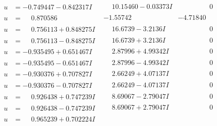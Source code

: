 \documentclass[1p]{elsarticle_modified}
\theoremstyle{definition}
\begin{document}
$$\begin{array}{c|c|c}
 \hline 
\begin{aligned}
u &= -0.749447 - 0.842317 I\end{aligned}
 & \phantom{-}10.15460 - 0.03373 I & \phantom{-0.000000 } 0 \\ \hline\begin{aligned}
u &= \phantom{-}0.870586\phantom{ +0.000000I}\end{aligned}
 & -1.55742\phantom{ +0.000000I} & -4.71840\phantom{ +0.000000I} \\ \hline\begin{aligned}
u &= \phantom{-}0.756113 + 0.848275 I\end{aligned}
 & \phantom{-}16.6739 - 3.2136 I & \phantom{-0.000000 } 0 \\ \hline\begin{aligned}
u &= \phantom{-}0.756113 - 0.848275 I\end{aligned}
 & \phantom{-}16.6739 + 3.2136 I & \phantom{-0.000000 } 0 \\ \hline\begin{aligned}
u &= -0.935495 + 0.651467 I\end{aligned}
 & \phantom{-}2.87996 + 4.99342 I & \phantom{-0.000000 } 0 \\ \hline\begin{aligned}
u &= -0.935495 - 0.651467 I\end{aligned}
 & \phantom{-}2.87996 - 4.99342 I & \phantom{-0.000000 } 0 \\ \hline\begin{aligned}
u &= -0.930376 + 0.707827 I\end{aligned}
 & \phantom{-}2.66249 + 4.07137 I & \phantom{-0.000000 } 0 \\ \hline\begin{aligned}
u &= -0.930376 - 0.707827 I\end{aligned}
 & \phantom{-}2.66249 - 4.07137 I & \phantom{-0.000000 } 0 \\ \hline\begin{aligned}
u &= \phantom{-}0.926438 + 0.747239 I\end{aligned}
 & \phantom{-}8.69067 - 2.79047 I & \phantom{-0.000000 } 0 \\ \hline\begin{aligned}
u &= \phantom{-}0.926438 - 0.747239 I\end{aligned}
 & \phantom{-}8.69067 + 2.79047 I & \phantom{-0.000000 } 0 \\ \hline\begin{aligned}
u &= \phantom{-}0.965239 + 0.702224 I\end{aligned}

\end{array}$$
\end{document}

